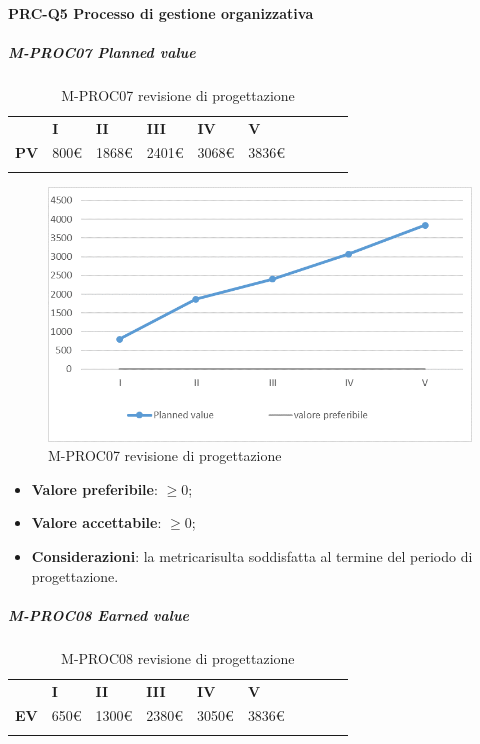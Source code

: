 \paragraph*{PRC-Q5 Processo di gestione organizzativa}
\subparagraph{M-PROC07 Planned value} \mbox{}
\begin{longtable}[H!] {						
		>{}p{38mm}  		
		>{}p{12mm}
		>{}p{12mm}		
		>{}p{12mm}		
		>{}p{12mm}		
		>{}p{12mm}		
		>{}p{12mm}
		>{}p{12mm}
		>{}p{12mm}
		>{}p{12mm}
	}
	\rowcolor{gray!50}
	\textbf{} & \textbf{I} & \textbf{II} & \textbf{III} & \textbf{IV} & \textbf{V} \TBstrut \\ [2mm]
	\textbf{PV} & 800\euro & 1868\euro & 2401\euro & 3068\euro & 3836\euro \TBstrut \\ [2mm]
	\rowcolor{white}
	\caption{M-PROC07 revisione di progettazione\glo}
\end{longtable}
\begin{figure}[H] 	
	\includegraphics[width=\linewidth]{./img/grafici/RP4.png}	
	\caption{M-PROC07 revisione di progettazione\glo}	
\end{figure}
\begin{itemize}
	\item \textbf{Valore preferibile}: $\ge0$;
	\item \textbf{Valore accettabile}: $\ge0$;
	\item \textbf{Considerazioni}: la metrica\glosp risulta soddisfatta al termine del periodo di progettazione\glo.
\end{itemize}
\subparagraph{M-PROC08 Earned value} \mbox{}
\begin{longtable}[H!] {						
		>{}p{38mm}  		
		>{}p{12mm}
		>{}p{12mm}		
		>{}p{12mm}		
		>{}p{12mm}		
		>{}p{12mm}		
		>{}p{12mm}
		>{}p{12mm}
		>{}p{12mm}
		>{}p{12mm}
	}
	\rowcolor{gray!50}
	\textbf{} & \textbf{I} & \textbf{II} & \textbf{III} & \textbf{IV} & \textbf{V} \TBstrut \\ [2mm]
	\textbf{EV} & 650\euro & 1300\euro & 2380\euro & 3050\euro & 3836\euro \TBstrut \\ [2mm]
	\rowcolor{white}
	\caption{M-PROC08 revisione di progettazione\glo}
\end{longtable}
